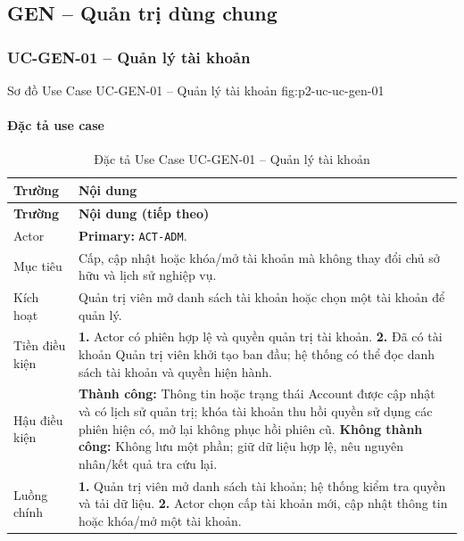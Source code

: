 \clearpage
\subsection{GEN -- Quản trị dùng chung}
\subsubsection{UC-GEN-01 -- Quản lý tài khoản}

  {Sơ đồ Use Case UC-GEN-01 -- Quản lý tài khoản}
  {fig:p2-uc-uc-gen-01}

\paragraph{Đặc tả use case}
\small
\begin{longtable}{|L{26mm}|L{118mm}|}
  \caption{Đặc tả Use Case UC-GEN-01 -- Quản lý tài khoản}\label{tab:spec-UC-GEN-01}\\
  \hline
  \textbf{Trường} & \textbf{Nội dung}\\\hline
  \endfirsthead
  \hline
  \textbf{Trường} & \textbf{Nội dung (tiếp theo)}\\\hline
  \endhead
  Actor & \textbf{Primary:} \texttt{ACT-ADM}.\\\hline
  Mục tiêu & Cấp, cập nhật hoặc khóa/mở tài khoản mà không thay đổi chủ sở hữu và lịch sử nghiệp vụ.\\\hline
  Kích hoạt & Quản trị viên mở danh sách tài khoản hoặc chọn một tài khoản để quản lý.\\\hline
  Tiền điều kiện & \textbf{1.} Actor có phiên hợp lệ và quyền quản trị tài khoản.\newline
\textbf{2.} Đã có tài khoản Quản trị viên khởi tạo ban đầu; hệ thống có thể đọc danh sách tài khoản và quyền hiện hành.\\\hline
  Hậu điều kiện & \textbf{Thành công:} Thông tin hoặc trạng thái Account được cập nhật và có lịch sử quản trị; khóa tài khoản thu hồi quyền sử dụng các phiên hiện có, mở lại không phục hồi phiên cũ.\newline
  \textbf{Không thành công:} Không lưu một phần; giữ dữ liệu hợp lệ, nêu nguyên nhân/kết quả tra cứu lại.\\\hline
  Luồng chính & \textbf{1.} Quản trị viên mở danh sách tài khoản; hệ thống kiểm tra quyền và tải dữ liệu.\newline
\textbf{2.} Actor chọn cấp tài khoản mới, cập nhật thông tin hoặc khóa/mở một tài khoản.\newline

\end{longtable}
